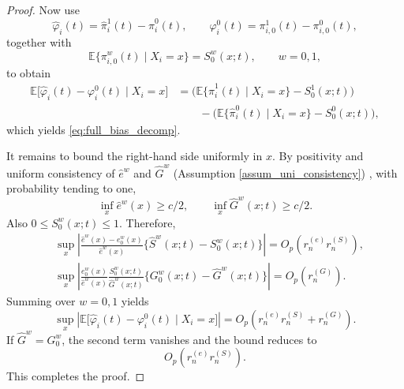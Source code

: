 \documentclass{article}
\newenvironment{proofof}[1]
{\renewcommand{\proofname}{Proof of #1}\begin{proof}}
{\end{proof}}
\begin{document}
\begin{proofof} {Theorem~\ref{thm:bias_full}:}
Now use
\[
\hat\varphi_i(t)=\hat\pi_i^1(t)-\hat\pi_i^0(t),
\qquad
\varphi_i^0(t)=\pi_{i,0}^1(t)-\pi_{i,0}^0(t),
\]
together with
\[
\mathbb E\{\pi_{i,0}^w(t)\mid X_i=x\}=S_0^w(x;t),
\qquad w=0,1,
\]
to obtain
\begin{align*}
\mathbb E\big[\hat\varphi_i(t)-\varphi_i^0(t)\mid X_i=x\big]
&=
\Big(\mathbb E\{\hat\pi_i^1(t)\mid X_i=x\}-S_0^1(x;t)\Big)\\
&\qquad-
\Big(\mathbb E\{\hat\pi_i^0(t)\mid X_i=x\}-S_0^0(x;t)\Big),
\end{align*}
which yields \eqref{eq:full_bias_decomp}.

It remains to bound the right-hand side uniformly in \(x\). By positivity and uniform consistency of \(\hat e^w\) and \(\hat G^w\) (Assumption \ref{assum_uni_consistency}) , with probability tending to one,
\[
\inf_x \hat e^w(x)\ge c/2,
\qquad
\inf_x \hat G^w(x;t)\ge c/2.
\]
Also \(0\le S_0^w(x;t)\le 1\). Therefore,
\begin{align*}
&\sup_x
\left|
\frac{\hat e^w(x)-e_0^w(x)}{\hat e^w(x)}
\big\{\hat S^w(x;t)-S_0^w(x;t)\big\}
\right|
=
O_p\!\left(r_n^{(e)}r_n^{(S)}\right),
\\
&\sup_x
\left|
\frac{e_0^w(x)}{\hat e^w(x)}
\frac{S_0^w(x;t)}{\hat G^w(x;t)}
\big\{G_0^w(x;t)-\hat G^w(x;t)\big\}
\right|
=
O_p\!\left(r_n^{(G)}\right).
\end{align*}
Summing over \(w=0,1\) yields
\[
\sup_x
\left|
\mathbb E\big[\hat\varphi_i(t)-\varphi_i^0(t)\mid X_i=x\big]
\right|
=
O_p\!\left(r_n^{(e)}r_n^{(S)}+r_n^{(G)}\right).
\]
If \(\hat G^w=G_0^w\), the second term vanishes and the bound reduces to
\[
O_p\!\left(r_n^{(e)}r_n^{(S)}\right).
\]
This completes the proof.
\end{proofof}
\end{document}
